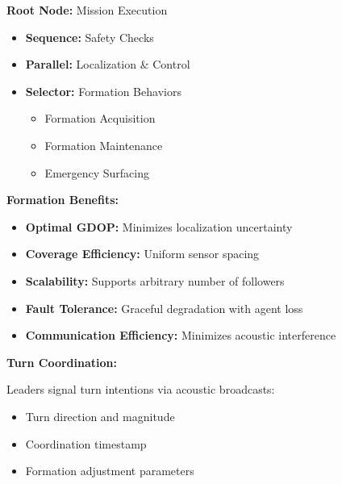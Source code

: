 \begin{tcolorbox}[colback=waspgrey!10, colframe=waspgrey, boxrule=0.5pt]
\textbf{Root Node:} Mission Execution
\begin{itemize}[leftmargin=1em, itemsep=0.03em]
    \item \textbf{Sequence:} Safety Checks
    \item \textbf{Parallel:} Localization \& Control
    \item \textbf{Selector:} Formation Behaviors
    \begin{itemize}[leftmargin=1em, itemsep=0.02em]
        \item Formation Acquisition
        \item Formation Maintenance
        \item Emergency Surfacing
    \end{itemize}
\end{itemize}
\end{tcolorbox}

\vspace{0.3em}

\textbf{Formation Benefits:}

\begin{itemize}[leftmargin=1em, itemsep=0.1em]
    \item \textbf{Optimal GDOP:} Minimizes localization uncertainty
    \item \textbf{Coverage Efficiency:} Uniform sensor spacing
    \item \textbf{Scalability:} Supports arbitrary number of followers
    \item \textbf{Fault Tolerance:} Graceful degradation with agent loss
    \item \textbf{Communication Efficiency:} Minimizes acoustic interference
\end{itemize}

\vspace{0.3em}

\textbf{Turn Coordination:}

Leaders signal turn intentions via acoustic broadcasts:
\begin{itemize}[leftmargin=1em, itemsep=0.05em]
    \item Turn direction and magnitude
    \item Coordination timestamp
    \item Formation adjustment parameters
\end{itemize}
